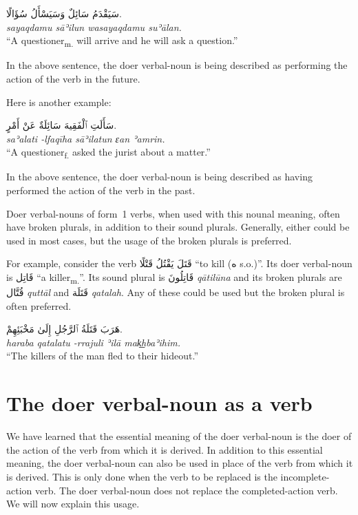 \documentclass[
  10pt,
]{book}
\begin{document}
\foreignlanguage{arabic}{سَيَقْدَمُ سَائِلٌ وَسَيَسْأَلُ سُؤَالًا.}\\
\emph{sayaqdamu sāʾilun wasayaqdamu suʾālan.}\\
\enquote{A questioner\textsubscript{m.} will arrive and he will ask a question.}

In the above sentence, the doer verbal-noun is being described as performing the action of the verb in the future.

Here is another example:

\foreignlanguage{arabic}{سَأَلَتِ ٱلْفَقِيهَ سَائِلَةٌ عَنْ أَمْرٍ.}\\
\emph{saʾalati -lfaqīha sāʾilatun ɛan ʾamrin.}\\
\enquote{A questioner\textsubscript{f.} asked the jurist about a matter.}

In the above sentence, the doer verbal-noun is being described as having performed the action of the verb in the past.

Doer verbal-nouns of form~1 verbs, when used with this nounal meaning, often have broken plurals, in addition to their sound plurals. Generally, either could be used in most cases, but the usage of the broken plurals is preferred.

For example, consider the verb \foreignlanguage{arabic}{قَتَلَ يَقْتُلُ قَتْلًا} \enquote{to kill (\foreignlanguage{arabic}{ه} s.o.)}. Its doer verbal-noun is \foreignlanguage{arabic}{قَاتِل} \enquote{a killer\textsubscript{m.}}. Its sound plural is \foreignlanguage{arabic}{قَاتِلُونَ} \emph{qātilūna} and its broken plurals are \foreignlanguage{arabic}{قُتَّال} \emph{quttāl} and \foreignlanguage{arabic}{قَتَلَة} \emph{qatalah}. Any of these could be used but the broken plural is often preferred.

\foreignlanguage{arabic}{هَرَبَ قَتَلَةُ ٱلرَّجُلِ إِلَىٰ مَخْبَئِهِمْ.}\\
\emph{haraba qatalatu -rrajuli ʾilā mak͟hbaʾihim.}\\
\enquote{The killers of the man fled to their hideout.}

\section{The doer verbal-noun as a verb}\label{the-doer-verbal-noun-as-a-verb}

We have learned that the essential meaning of the doer verbal-noun is the doer of the action of the verb from which it is derived. In addition to this essential meaning, the doer verbal-noun can also be used in place of the verb from which it is derived. This is only done when the verb to be replaced is the incomplete-action verb. The doer verbal-noun does not replace the completed-action verb. We will now explain this usage.
\end{document}
